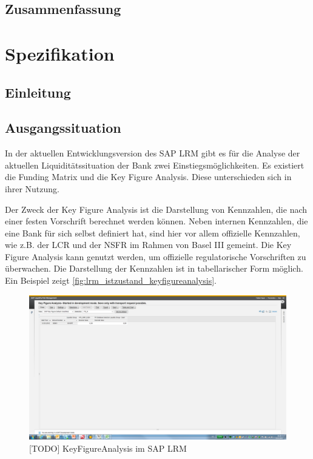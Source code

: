 \section{Zusammenfassung}

\chapter{Spezifikation}
\section{Einleitung}

\section{Ausgangssituation}

In der aktuellen Entwicklungsversion des SAP LRM gibt es für die Analyse der aktuellen Liquiditätssituation der Bank zwei Einstiegsmöglichkeiten. Es existiert die Funding Matrix und die Key Figure Analysis. Diese unterschieden sich in ihrer Nutzung.

Der Zweck der Key Figure Analysis ist die Darstellung von Kennzahlen, die nach einer festen Vorschrift berechnet werden können. Neben internen Kennzahlen, die eine Bank für sich selbst definiert hat, sind hier vor allem offizielle Kennzahlen, wie z.B. der LCR und der NSFR im Rahmen von Basel III gemeint. Die Key Figure Analysis kann genutzt werden, um offizielle regulatorische Vorschriften zu überwachen. Die Darstellung der Kennzahlen ist in tabellarischer Form möglich. Ein Beispiel zeigt \vref{fig:lrm_istzustand_keyfigureanalysis}.

\begin{figure}[h]
\centering
\setlength{\unitlength}{1mm}
\includegraphics[width=15cm]{images/KeyFigureAnalysis_Example.png}
\caption{[TODO] KeyFigureAnalysis im SAP LRM\label{fig:lrm_istzustand_keyfigureanalysis}}
\end{figure}

